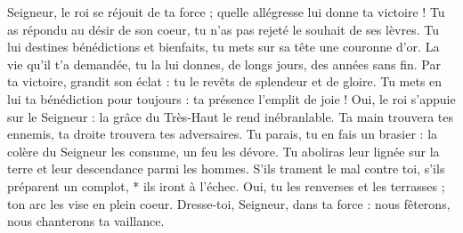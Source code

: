Seigneur, le roi se réjouit de ta force ; quelle allégresse lui donne ta victoire !
\versseparator
Tu as répondu au désir de son coeur, tu n'as pas rejeté le souhait de ses lèvres.
\versseparator
Tu lui destines bénédictions et bienfaits, tu mets sur sa tête une couronne d'or.
\versseparator
La vie qu'il t'a demandée, tu la lui donnes, de longs jours, des années sans fin.
\versseparator
Par ta victoire, grandit son éclat : tu le revêts de splendeur et de gloire.
\versseparator
Tu mets en lui ta bénédiction pour toujours : ta présence l'emplit de joie !
\versseparator
Oui, le roi s'appuie sur le Seigneur : la grâce du Très-Haut le rend inébranlable.
\versseparator
Ta main trouvera tes ennemis, ta droite trouvera tes adversaires.
\versseparator
Tu parais, tu en fais un brasier : la colère du Seigneur les consume, un feu les dévore.
\versseparator
Tu aboliras leur lignée sur la terre et leur descendance parmi les hommes.
\versseparator
S'ils trament le mal contre toi, s'ils préparent un complot, * ils iront à l'échec.
\versseparator
Oui, tu les renverses et les terrasses ; ton arc les vise en plein coeur.
\versseparator
Dresse-toi, Seigneur, dans ta force : nous fêterons, nous chanterons ta vaillance.

